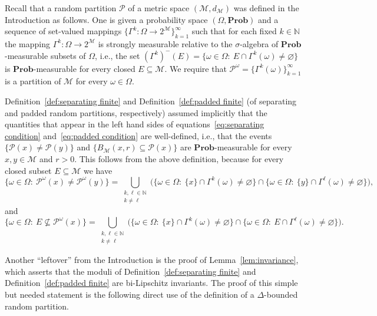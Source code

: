 \documentclass[11pt,reqno]{amsart}
\renewcommand{\k}{\{1,\ldots,k\}}
\theoremstyle{remark}
\newcommand{\MM}{\mathcal{M}}
\renewcommand{\subset}{\subseteq}
\newcommand{\N}{\mathbb N}
\renewcommand{\Pr}{\mathbf{Prob}}
\renewcommand{\emptyset}{\varnothing}
\renewcommand{\1}{\mathbf 1}
\newcommand{\Part}{\mathscr{P}}
\begin{document}
Recall that  a random partition $\Part$ of a metric space $(\MM,d_\MM)$ was  defined in the Introduction as follows. One is given a probability space $(\Omega,\Pr)$ and a sequence of set-valued mappings $\{\Gamma^k:\Omega\to 2^\MM\}_{k=1}^\infty$ such that for each fixed $k\in \N$ the mapping $\Gamma^k:\Omega\to 2^\MM$ is strongly measurable relative to the $\sigma$-algebra of $\Pr$-measurable subsets of $\Omega$, i.e., the set $(\Gamma^k)^-(E)=\{\omega\in \Omega:\ E\cap \Gamma^k(\omega)\neq \emptyset \}$  is $\Pr$-measurable  for every closed $E\subset \MM$. We require that $\Part^\omega=\{\Gamma^k(\omega)\}_{k=1}^\infty$ is a partition of $\MM$ for every $\omega\in \Omega$.

Definition~\ref{def:separating finite} and Definition~\ref{def:padded finite}  (of separating and padded random partitions, respectively) assumed implicitly that the quantities that appear in the left hand sides of equations~\eqref{eq:separating condition} and~\eqref{eq:padded condition} are well-defined, i.e., that the events $\{\Part(x)\neq \Part(y)\}$ and $\{B_\MM(x,r)\subset \Part(x)\}$ are $\Pr$-measurable for every $x,y\in \MM$ and $r>0$. This follows from the  above definition, because  for  every  closed subset $E\subset \MM$ we have
\begin{equation*}
\big\{\omega\in \Omega:\ \Part^\omega(x)\neq \Part^\omega(y)\big\}=\bigcup_{\substack{k,\ell\in \N\\k\neq\ell}} \Big( \big\{\omega\in \Omega:\ \{x\}\cap \Gamma^k(\omega)\neq\emptyset \big\}\cap \big\{\omega\in \Omega:\ \{y\}\cap \Gamma^\ell(\omega)\neq\emptyset\big\}\Big),
\end{equation*}
and
$$
\big\{\omega\in \Omega:\ E\not\subset \Part^\omega(x)\big\}=\bigcup_{\substack{k,\ell\in \N\\k\neq\ell}} \Big( \big\{\omega\in \Omega:\ \{x\}\cap \Gamma^k(\omega)\neq\emptyset\big\}\cap \big\{\omega\in \Omega:\ E\cap \Gamma^\ell(\omega)\neq \emptyset\big\}\Big).
$$


Another ``leftover'' from the Introduction is the proof of Lemma~\ref{lem:invariance}, which asserts that the moduli of  Definition~\ref{def:separating finite} and Definition~\ref{def:padded finite} are bi-Lipschitz invariants. The proof of this simple but needed statement is the following  direct use of the definition of a $\Delta$-bounded random partition.
\end{document}
